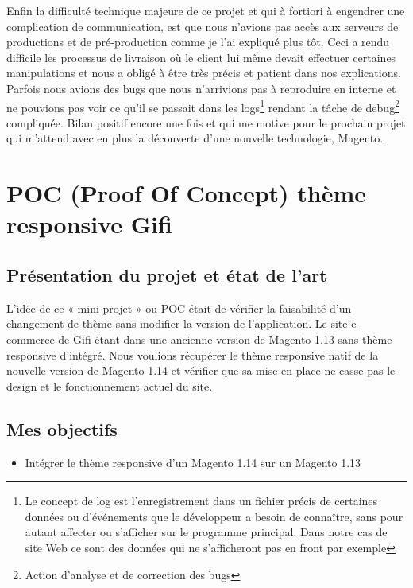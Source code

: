\documentclass[a4paper,11pt,twoside]{report}
\begin{document}
    Enfin la difficulté technique majeure de ce projet et qui à fortiori à engendrer une complication de communication, est que nous n'avions pas accès aux serveurs de productions et de pré-production comme je l'ai expliqué plus tôt. Ceci a rendu difficile les processus de livraison où le client lui même devait effectuer certaines manipulations et nous a obligé à être très précis et patient dans nos explications. Parfois nous avions des bugs que nous n'arrivions pas à reproduire en interne et ne pouvions pas voir ce qu'il se passait dans les logs\footnote{Le concept de log est l'enregistrement dans un fichier précis de certaines données ou d'événements que le développeur a besoin de connaître, sans pour autant affecter ou s'afficher sur le programme principal. Dans notre cas de site Web ce sont des données qui ne s'afficheront pas en front par exemple} rendant la tâche de debug\footnote{Action d'analyse et de correction des bugs} compliquée. Bilan positif encore une fois et qui me motive pour le prochain projet qui m'attend avec en plus la découverte d'une nouvelle technologie, Magento.
    
\newpage
    
  \section{POC (Proof Of Concept) thème responsive Gifi}
    \subsection*{Présentation du projet et état de l'art}
    L'idée de ce « mini-projet » ou POC était de vérifier la faisabilité d'un changement de thème sans modifier la version de l'application. Le site e-commerce de Gifi étant dans une ancienne version de Magento 1.13 sans thème responsive d'intégré. Nous voulions récupérer le thème responsive natif de la nouvelle version de Magento 1.14 et vérifier que sa mise en place ne casse pas le design et le fonctionnement actuel du site. 
    \subsection*{Mes objectifs}
      \begin{itemize}

	\item Intégrer le thème responsive d'un Magento 1.14 sur un Magento 1.13 

      \end{itemize}
\end{document}
